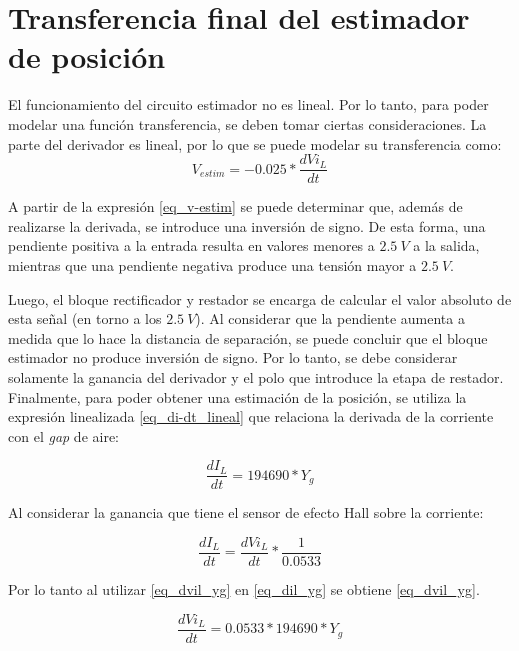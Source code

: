 \section{Transferencia final del estimador de posici\'{o}n}

El funcionamiento del circuito estimador no es lineal.  Por lo tanto, para poder modelar una función transferencia, se deben tomar ciertas consideraciones. La parte del derivador es lineal, por lo que se puede modelar su transferencia como:
\begin{equation}\label{eq_v-estim}
	V_{estim}=-0.025*\frac{dVi_L}{dt} 
\end{equation}

A partir de la expresión \ref{eq_v-estim} se puede determinar que, además de realizarse la derivada, se introduce una inversión de signo. De esta forma, una pendiente positiva a la entrada resulta en valores menores a $2.5\:V$ a la salida, mientras que una pendiente negativa produce una tensión mayor a $2.5\:V$.

Luego, el bloque rectificador y restador se encarga de calcular el valor absoluto de esta señal (en torno a los $2.5\:V$). Al considerar que la pendiente aumenta a medida que lo hace la distancia de separación, se puede concluir que el bloque estimador no produce inversión de signo. Por lo tanto, se debe considerar solamente la ganancia del derivador y el polo que introduce la etapa de restador. Finalmente, para poder obtener una estimación de la posición, se utiliza la expresión linealizada \ref{eq_di-dt_lineal} que relaciona la derivada de la corriente con el \textsl{gap} de aire:

\begin{equation} \label{eq_dil_yg}
	\frac{dI_{L}}{dt} = 194690 * Y_{g}
\end{equation}


Al considerar la ganancia que tiene el sensor de efecto Hall sobre la corriente:

\begin{equation} \label{eq_dil_dvil}
	\frac{dI_{L}}{dt} =\frac{dVi_{L}}{dt}*\frac{1}{0.0533}
\end{equation}

Por lo tanto al utilizar \ref{eq_dvil_yg} en \ref{eq_dil_yg} se obtiene \ref{eq_dvil_yg}.

\begin{equation} \label{eq_dvil_yg}
	\frac{dVi_{L}}{dt} = 0.0533*194690*Y_{g}
\end{equation}



